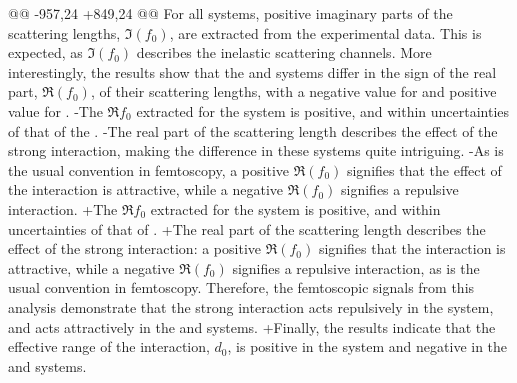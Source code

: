 \begin{table}[htbp]
@@ -957,24 +849,24 @@
 For all \LamK systems, positive imaginary parts of the scattering lengths, $\Im(f_{0})$, are extracted from the experimental data. 
 This is expected, as $\Im(f_{0})$ describes the inelastic scattering channels.
 More interestingly, the results show that the \LamKchP and \LamKchM systems differ in the sign of the real part, $\Re(f_{0})$, of their scattering lengths, with a negative value for \LamKchP and positive value for \LamKchM.
-The $\Re f_{0}$ extracted for the \LamKs system is positive, and within uncertainties of that of the \LamKchM. 
-The real part of the scattering length describes the effect of the strong interaction, making the difference in these systems quite intriguing.
-As is the usual convention in femtoscopy, a positive $\Re(f_{0})$ signifies that the effect of the interaction is attractive, while a negative $\Re(f_{0})$ signifies a repulsive interaction.
+The $\Re f_{0}$ extracted for the \LamKs system is positive, and within uncertainties of that of \LamKchM. 
+The real part of the scattering length describes the effect of the strong interaction: a positive $\Re(f_{0})$ signifies that the interaction is attractive, while a negative $\Re(f_{0})$ signifies a repulsive interaction, as is the usual convention in femtoscopy.
 Therefore, the femtoscopic signals from this analysis demonstrate that the strong interaction acts repulsively in the \LamKchP system, and acts attractively in the \LamKchM and \LamKs systems.
+Finally, the results indicate that the effective range of the interaction, $d_{0}$, is positive in the \LamKchP system and negative in the \LamKchM and \LamKs systems.
 

\end{table}
